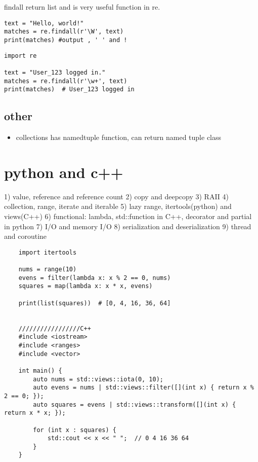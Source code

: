 \documentclass[a4paper,12pt,twoside]{book}
\begin{document}
findall return list and is very useful function in re.
\begin{lstlisting}
text = "Hello, world!"
matches = re.findall(r'\W', text)
print(matches) #output , ' ' and !
\end{lstlisting}

\begin{lstlisting}
import re

text = "User_123 logged in."
matches = re.findall(r'\w+', text)
print(matches)  # User_123 logged in
\end{lstlisting}

\section{other}
\begin{itemize}
	\item collections has namedtuple function, can return named tuple class
\end{itemize}

\chapter{python and c++}
1) value, reference and reference count
2) copy and deepcopy
3) RAII
4) collection, range, iterate and iterable
5) lazy range, itertools(python) and views(C++)
6) functional: lambda, std::function in C++, decorator and partial in python
7) I/O and memory I/O
8) serialization and deserialization 
9) thread and coroutine
\begin{lstlisting}
	import itertools
	
	nums = range(10)
	evens = filter(lambda x: x % 2 == 0, nums)
	squares = map(lambda x: x * x, evens)
	
	print(list(squares))  # [0, 4, 16, 36, 64]
	
	
	/////////////////C++
	#include <iostream>
	#include <ranges>
	#include <vector>
	
	int main() {
		auto nums = std::views::iota(0, 10);
		auto evens = nums | std::views::filter([](int x) { return x % 2 == 0; });
		auto squares = evens | std::views::transform([](int x) { return x * x; });
		
		for (int x : squares) {
			std::cout << x << " ";  // 0 4 16 36 64
		}
	}	
\end{lstlisting}




%
\end{document}
